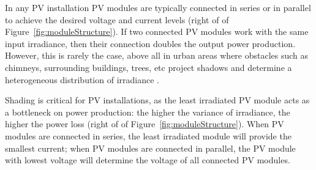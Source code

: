 In any PV installation PV modules are typically connected in series or in parallel to achieve the desired voltage and current levels (right of of Figure~\ref{fig:moduleStructure}). %
If two connected PV modules work with the same input irradiance, then their connection doubles the output power production. However, this is rarely the case, above all in urban areas where obstacles such as chimneys, surrounding buildings, trees, etc project shadows and determine a heterogeneous distribution of irradiance \cite{LI2020118795}. 

Shading is critical for PV installations, as the least irradiated PV module acts as a bottleneck on power production: the higher the variance of irradiance, the higher the power loss (right of of Figure~\ref{fig:moduleStructure}). 
When PV modules are connected in series, the least irradiated module will provide the smallest current; when PV modules are connected in parallel, the PV module with lowest voltage will determine the voltage of all connected PV modules. 

